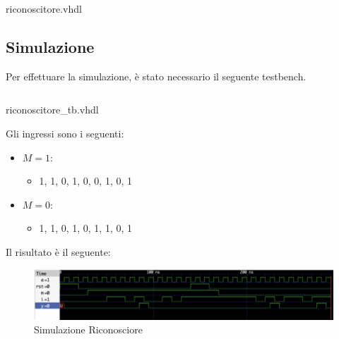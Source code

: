 \begin{code}
    \inputminted[frame=lines, framesep=2mm, baselinestretch=1.2, bgcolor=LightGray, fontsize=\footnotesize, linenos]{vhdl}{vhdl_files/riconoscitore.vhdl}
    \caption{riconoscitore.vhdl}
    \label{lst:RIC}
\end{code}

\subsection{Simulazione}
Per effettuare la simulazione, è stato necessario il seguente testbench.
\begin{code}
    \inputminted[frame=lines, framesep=2mm, baselinestretch=1.2, bgcolor=LightGray, fontsize=\footnotesize, linenos]{vhdl}{vhdl_files/riconoscitore_tb.vhdl}
    \caption{riconoscitore\_tb.vhdl}
    \label{lst:RIC}
\end{code}

Gli ingressi sono i seguenti:
\begin{itemize}
    \item $M=1$:
        \begin{itemize}
            \item 1, 1, 0, 1, 0, 0, 1, 0, 1
        \end{itemize}
    \item $M=0$:
        \begin{itemize}
            \item 1, 1, 0, 1, 0, 1, 1, 0, 1
        \end{itemize}
\end{itemize}

Il risultato è il seguente:

\begin{figure}[H]
	\centering
	\includegraphics[width=1\textwidth]{img/Sim_RIC}
	\caption{Simulazione Riconosciore}
	\label{aut_ric_seq} 
\end{figure}

